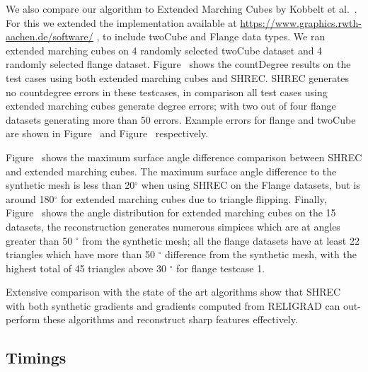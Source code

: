 We also compare our algorithm to Extended Marching Cubes by Kobbelt et al.~\cite{kbsh-fssev-01}. For this we extended the implementation available at \url{https://www.graphics.rwth-aachen.de/software/} \href{https://www.graphics.rwth-aachen.de/software/}{}, to include twoCube and Flange data types. We ran extended marching cubes on 4 randomly selected twoCube dataset and 4 randomly selected flange dataset. Figure~\protect{} shows the countDegree results on the test cases using both extended marching cubes and SHREC. SHREC generates no countdegree errors in these testcases, in comparison all test cases using extended marching cubes generate degree errors; with two out of four flange datasets generating more than 50 errors.
Example errors for flange and twoCube are shown in Figure~\protect{} and Figure~\protect{} respectively. 

Figure~\protect{} shows the maximum surface angle difference comparison between SHREC and extended marching cubes. The maximum surface angle difference to the synthetic mesh is less than 20$^\circ$ when using SHREC on the Flange datasets, but is around 180$^\circ$ for extended marching cubes due to triangle flipping. Finally, Figure~\protect{} shows the angle distribution for extended marching cubes on the 15 datasets, the reconstruction generates numerous simpices which are at angles greater than 50 $^\circ$ from the synthetic mesh; all the flange datasets have at least 22 triangles which have more than 50  $^\circ$ difference from the synthetic mesh, with the highest total of 45 triangles above 30 $^\circ$ for flange testcase 1.


Extensive comparison with the state of the art algorithms show that SHREC with both synthetic gradients and gradients computed from RELIGRAD can out-perform these algorithms and reconstruct sharp features effectively. 


\subsection{Timings}

